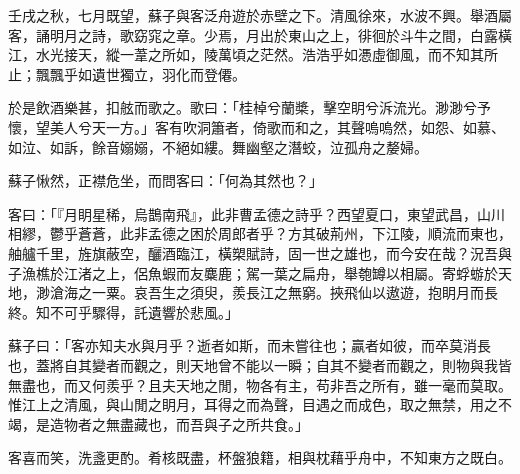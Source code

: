 壬戌之秋，七月既望，蘇子與客泛舟遊於赤壁之下。清風徐來，水波不興。舉酒屬客，誦明月之詩，歌窈窕之章。少焉，月出於東山之上，徘徊於斗牛之間，白露橫江，水光接天，縱一葦之所如，陵萬頃之茫然。浩浩乎如慿虛御風，而不知其所止；飄飄乎如遺世獨立，羽化而登僊。

於是飲酒樂甚，扣舷而歌之。歌曰：「桂棹兮蘭槳，擊空眀兮泝流光。渺渺兮予懷，望美人兮天一方。」客有吹洞簫者，倚歌而和之，其聲嗚嗚然，如怨、如慕、如泣、如訴，餘音嫋嫋，不絕如縷。舞幽壑之潛蛟，泣孤舟之嫠婦。

蘇子愀然，正襟危坐，而問客曰：「何為其然也？」

客曰：「『月眀星稀，烏鵲南飛』，此非曹孟德之詩乎？西望夏口，東望武昌，山川相繆，鬱乎蒼蒼，此非孟德之困於周郎者乎？方其破荊州，下江陵，順流而東也，舳艫千里，旌旗蔽空，釃酒臨江，橫槊賦詩，固一世之雄也，而今安在哉？況吾與子漁樵於江渚之上，侶魚蝦而友麋鹿；駕一葉之扁舟，舉匏罇以相屬。寄蜉蝣於天地，渺滄海之一粟。哀吾生之須臾，羨長江之無窮。挾飛仙以遨遊，抱眀月而長終。知不可乎驟得，託遺響於悲風。」

蘇子曰：「客亦知夫水與月乎？逝者如斯，而未嘗往也；贏者如彼，而卒莫消長也，蓋將自其變者而觀之，則天地曾不能以一瞬；自其不變者而觀之，則物與我皆無盡也，而又何羨乎？且夫天地之閒，物各有主，苟非吾之所有，雖一毫而莫取。惟江上之清風，與山閒之眀月，耳得之而為聲，目遇之而成色，取之無禁，用之不竭，是造物者之無盡藏也，而吾與子之所共食。」

客喜而笑，洗盞更酌。肴核既盡，杯盤狼籍，相與枕藉乎舟中，不知東方之既白。
